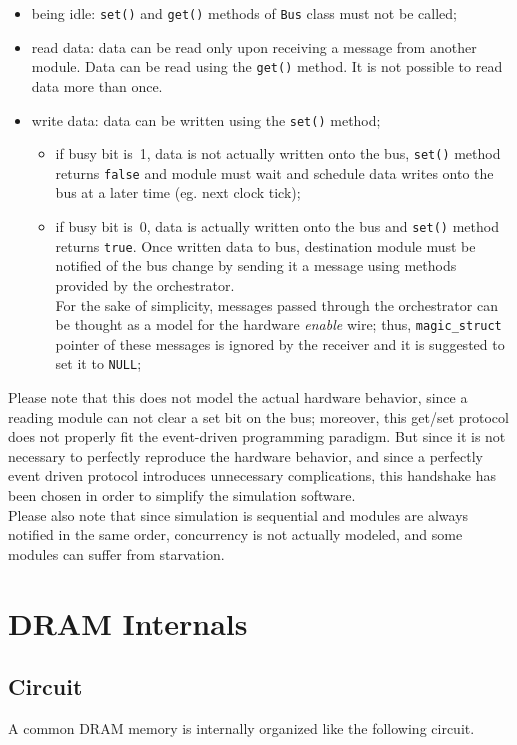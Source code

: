 \documentclass[a4paper,12pt]{article}
\begin{document}
\begin{itemize}
  \item being idle: \texttt{set()} and \texttt{get()} methods of \texttt{Bus} class must not be called;
  \item read data: data can be read only upon receiving a message from another module. Data can be read using the \texttt{get()} method. It is not possible to read data more than once.
  \item write data: data can be written using the \texttt{set()} method;
  \begin{itemize}
    \item if busy bit is~1, data is not actually written onto the bus, \texttt{set()} method returns \texttt{false} and module must wait and schedule data writes onto the bus at a later time (eg. next clock tick);
    \item if busy bit is~0, data is actually written onto the bus and \texttt{set()} method returns \texttt{true}.
    Once written data to bus, destination module must be notified of the bus change by sending it a message using methods provided by the orchestrator.\\
    For the sake of simplicity, messages passed through the orchestrator can be thought as a model for the hardware \emph{enable} wire; thus, \texttt{magic\_struct} pointer of these messages is ignored by the receiver and it is suggested to set it to \texttt{NULL};
  \end{itemize}
\end{itemize}

Please note that this does not model the actual hardware behavior, since a reading module can not clear a set bit on the bus;
moreover, this get/set protocol does not properly fit the event-driven programming paradigm.
But since it is not necessary to perfectly reproduce the hardware behavior, and since a perfectly event driven protocol introduces unnecessary complications, this handshake has been chosen in order to simplify the simulation software.\\

Please also note that since simulation is sequential and modules are always notified in the same order, concurrency is not actually modeled, and some modules can suffer from starvation.

\section{DRAM Internals}
\subsection{Circuit}
A common DRAM memory is internally organized like the following circuit.
\end{document}
